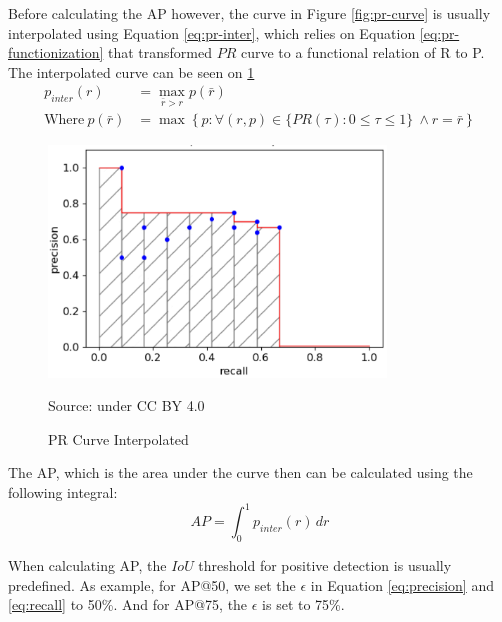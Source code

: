   Before calculating the AP however, the curve in Figure \ref{fig:pr-curve} is usually interpolated using Equation \ref{eq:pr-inter},
  which relies on Equation \ref{eq:pr-functionization} that transformed $PR$ curve to a functional relation of R to P.
  The interpolated curve can be seen on \ref{fig:pr-interp}
  \begin{align}
    \label{eq:pr-inter}
    p_{inter}(r) &= \max_{\bar{r}>r} p(\bar{r})\\
    \label{eq:pr-functionization}
    \text{Where}~p(\bar{r}) &= \max \left\{p : \forall (r,p) \in \{PR(\tau) : 0\leq\tau\leq 1\}\ \land r=\bar{r}\right\}%
  \end{align}

  \begin{figure}[p]
        \centering
        \includegraphics[width=0.8\textwidth]{figures/pr-interp.png}
        \vspace{-1ex}
        \caption*{Source: \textcite{map-hui} under CC BY 4.0}
        \vspace{-1ex}
        \caption{PR Curve Interpolated}
        \label{fig:pr-interp}
  \end{figure}
  The AP, which is the area under the curve then can be calculated using the following integral:
  \begin{equation}
    AP = \int_{0}^{1} p_{inter}(r) \, dr
  \end{equation}

  When calculating AP, the $IoU$ threshold for positive detection is usually predefined. As example,
  for AP@50, we set the $\epsilon$ in Equation \ref{eq:precision} and \ref{eq:recall} to 50\%. And for 
  AP@75, the $\epsilon$ is set to 75\%.

